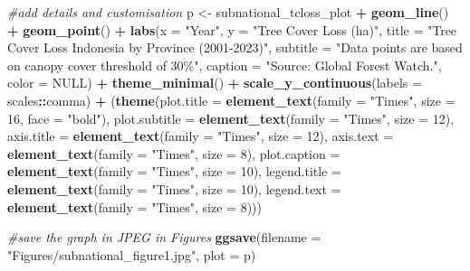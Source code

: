 \documentclass[
]{article}
\newenvironment{Shaded}{\begin{snugshade}}{\end{snugshade}}
\newcommand{\AttributeTok}[1]{\textcolor[rgb]{0.13,0.29,0.53}{#1}}
\newcommand{\CommentTok}[1]{\textcolor[rgb]{0.56,0.35,0.01}{\textit{#1}}}
\newcommand{\ConstantTok}[1]{\textcolor[rgb]{0.56,0.35,0.01}{#1}}
\newcommand{\DecValTok}[1]{\textcolor[rgb]{0.00,0.00,0.81}{#1}}
\newcommand{\FunctionTok}[1]{\textcolor[rgb]{0.13,0.29,0.53}{\textbf{#1}}}
\newcommand{\NormalTok}[1]{#1}
\newcommand{\OtherTok}[1]{\textcolor[rgb]{0.56,0.35,0.01}{#1}}
\newcommand{\SpecialCharTok}[1]{\textcolor[rgb]{0.81,0.36,0.00}{\textbf{#1}}}
\newcommand{\StringTok}[1]{\textcolor[rgb]{0.31,0.60,0.02}{#1}}
\begin{document}
\begin{Shaded}
\begin{Highlighting}[]
\CommentTok{\#add details and customisation}
\NormalTok{p }\OtherTok{\textless{}{-}}\NormalTok{ subnational\_tcloss\_plot }\SpecialCharTok{+} \FunctionTok{geom\_line}\NormalTok{() }\SpecialCharTok{+} \FunctionTok{geom\_point}\NormalTok{() }\SpecialCharTok{+}
  \FunctionTok{labs}\NormalTok{(}\AttributeTok{x =} \StringTok{"Year"}\NormalTok{, }\AttributeTok{y =} \StringTok{"Tree Cover Loss (ha)"}\NormalTok{,}
       \AttributeTok{title =} \StringTok{"Tree Cover Loss Indonesia by Province (2001{-}2023)"}\NormalTok{,}
       \AttributeTok{subtitle =} \StringTok{"Data points are based on canopy cover threshold of 30\%"}\NormalTok{,}
       \AttributeTok{caption =} \StringTok{"Source: Global Forest Watch."}\NormalTok{, }\AttributeTok{color =} \ConstantTok{NULL}\NormalTok{) }\SpecialCharTok{+}
  \FunctionTok{theme\_minimal}\NormalTok{() }\SpecialCharTok{+} \FunctionTok{scale\_y\_continuous}\NormalTok{(}\AttributeTok{labels =}\NormalTok{ scales}\SpecialCharTok{::}\NormalTok{comma) }\SpecialCharTok{+}
\NormalTok{  (}\FunctionTok{theme}\NormalTok{(}\AttributeTok{plot.title =} \FunctionTok{element\_text}\NormalTok{(}\AttributeTok{family =} \StringTok{"Times"}\NormalTok{, }\AttributeTok{size =} \DecValTok{16}\NormalTok{, }\AttributeTok{face =} \StringTok{"bold"}\NormalTok{),}
         \AttributeTok{plot.subtitle =} \FunctionTok{element\_text}\NormalTok{(}\AttributeTok{family =} \StringTok{"Times"}\NormalTok{, }\AttributeTok{size =} \DecValTok{12}\NormalTok{),}
         \AttributeTok{axis.title =} \FunctionTok{element\_text}\NormalTok{(}\AttributeTok{family =} \StringTok{"Times"}\NormalTok{, }\AttributeTok{size =} \DecValTok{12}\NormalTok{),}
         \AttributeTok{axis.text =} \FunctionTok{element\_text}\NormalTok{(}\AttributeTok{family =} \StringTok{"Times"}\NormalTok{, }\AttributeTok{size =} \DecValTok{8}\NormalTok{), }
         \AttributeTok{plot.caption =} \FunctionTok{element\_text}\NormalTok{(}\AttributeTok{family =} \StringTok{"Times"}\NormalTok{, }\AttributeTok{size =} \DecValTok{10}\NormalTok{),}
         \AttributeTok{legend.title =} \FunctionTok{element\_text}\NormalTok{(}\AttributeTok{family =} \StringTok{"Times"}\NormalTok{, }\AttributeTok{size =} \DecValTok{10}\NormalTok{),}
         \AttributeTok{legend.text =} \FunctionTok{element\_text}\NormalTok{(}\AttributeTok{family =} \StringTok{"Times"}\NormalTok{, }\AttributeTok{size =} \DecValTok{8}\NormalTok{)))}

\CommentTok{\#save the graph in JPEG in \textquotesingle{}Figures\textquotesingle{}}
\FunctionTok{ggsave}\NormalTok{(}\AttributeTok{filename =} \StringTok{"Figures/subnational\_figure1.jpg"}\NormalTok{, }\AttributeTok{plot =}\NormalTok{ p)}



\end{Highlighting}
\end{Shaded}
\end{document}
